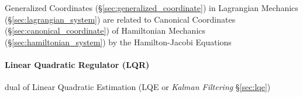 Generalized Coordinates (\S\ref{sec:generalized_coordinate}) in Lagrangian
Mechanics (\S\ref{sec:lagrangian_system}) are related to Canonical Coordinates
(\S\ref{sec:canonical_coordinate}) of Hamiltonian Mechanics
(\S\ref{sec:hamiltonian_system}) by the Hamilton-Jacobi Equations



\paragraph{Linear Quadratic Regulator (LQR)}\label{sec:lqr}\hfill

dual of Linear Quadratic Estimation (LQE or \emph{Kalman Filtering}
\S\ref{sec:lqe})
